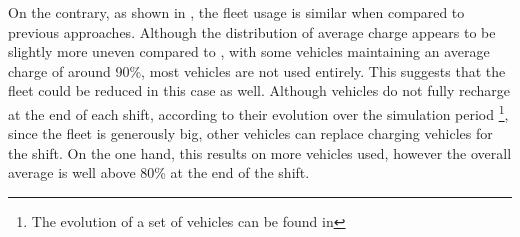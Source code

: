  On the contrary, as shown in , the fleet usage is similar when compared to previous approaches. Although the distribution of average charge appears to be slightly more uneven compared to  , with some vehicles maintaining an average charge of around 90\%, most vehicles are not used entirely. This suggests that the fleet could be reduced in this case as well. Although vehicles do not fully recharge at the end of each shift, according to their evolution over the simulation period \footnote{The evolution of a set of vehicles can be found in }, since the fleet is generously big, other vehicles can replace charging vehicles for the shift. On the one hand, this results on more vehicles used, however the overall average is well above 80\% at the end of the shift. 

